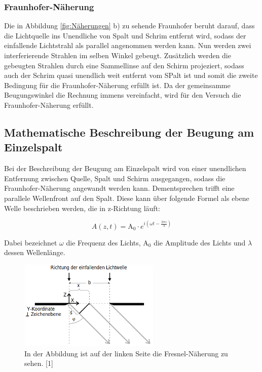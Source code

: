 \documentclass[titlepage = firstcover]{scrartcl}
\begin{document}
            \subsubsection*{Fraunhofer-Näherung}
                Die in Abbildung \ref{fig:Näherungen} b) zu sehende Fraunhofer beruht darauf, dass die Lichtquelle ins Unendliche von Spalt und Schrim entfernt wird, sodass der einfallende 
                Lichtstrahl als parallel angenommen werden kann. Nun werden zwei interferierende Strahlen im selben Winkel gebeugt. Zusätzlich werden die gebeugten Strahlen durch eine 
                Sammellinse auf den Schirm projeziert, sodass auch der Schrim quasi unendlich weit entfernt vom SPalt ist und somit die zweite Bedingung für die Fraunhofer-Näherung erfüllt ist.
                Da der gemeinsamme Beugungswinkel die Rechnung immens vereinfacht, wird für den Versuch die Fraunhofer-Näherung erfüllt.
                
    
        \subsection{Mathematische Beschreibung der Beugung am Einzelspalt}
            Bei der Beschreibung der Beugung am Einzelspalt wird von einer unendlichen Entfernung zwischen Quelle, Spalt und Schirm ausgegangen, sodass die Fraunhofer-Näherung angewandt werden kann.
            Dementsprechen trifft eine parallele Wellenfront auf den Spalt. Diese kann über folgende Formel als ebene Welle beschrieben werden, die in z-Richtung läuft:

            \begin{equation*}
                A(z,t) = \text{A}_0 \cdot e^{i\left(\omega t - \frac{2\pi z}{\lambda}\right)}
            \end{equation*}

            \noindent
            Dabei bezeichnet $\omega$ die Frequenz des Lichts, $\text{A}_0$ die Amplitude des Lichts und $\lambda$ dessen Wellenlänge. \newline
            
            \FloatBarrier

            \begin{figure}[h]
              \centering
              \includegraphics[width = 0.6\textwidth]{Bilder/Phasendifferenz.png}
              \caption{In der Abbildung ist auf der linken Seite die Fresnel-Näherung zu sehen. [1]}
              \label{fig:Phasendifferenz}
            \end{figure}
\end{document}
